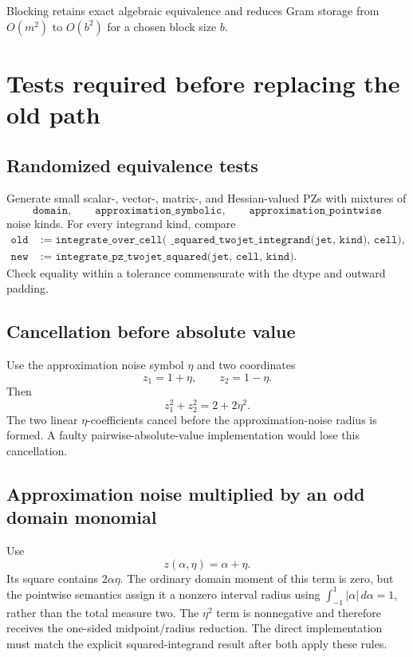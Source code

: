 \documentclass[11pt]{article}
\newcommand{\abs}[1]{\left\lvert #1\right\rvert}
\begin{document}
Blocking retains exact algebraic equivalence and reduces Gram storage from
\(O(m^2)\) to \(O(b^2)\) for a chosen block size \(b\).

\section{Tests required before replacing the old path}
\label{sec:tests}

\subsection{Randomized equivalence tests}

Generate small scalar-, vector-, matrix-, and Hessian-valued PZs with mixtures
of
\[
    \texttt{domain},\qquad
    \texttt{approximation\_symbolic},\qquad
    \texttt{approximation\_pointwise}
\]
noise kinds.  For every integrand kind, compare
\begin{align*}
    \texttt{old}
    &:=
    \texttt{integrate\_over\_cell(
       \_squared\_twojet\_integrand(jet, kind), cell)},\\
    \texttt{new}
    &:=
    \texttt{integrate\_pz\_twojet\_squared(jet, cell, kind)}.
\end{align*}
Check equality within a tolerance commensurate with the dtype and outward
padding.

\subsection{Cancellation before absolute value}

Use the approximation noise symbol \(\eta\) and two coordinates
\[
    z_1=1+\eta,
    \qquad
    z_2=1-\eta.
\]
Then
\[
    z_1^2+z_2^2=2+2\eta^2.
\]
The two linear \(\eta\)-coefficients cancel before the approximation-noise radius is
formed.  A faulty pairwise-absolute-value implementation would lose this
cancellation.

\subsection{Approximation noise multiplied by an odd domain monomial}

Use
\[
    z(\alpha,\eta)=\alpha+\eta.
\]
Its square contains \(2\alpha\eta\).  The ordinary domain moment of this term
is zero, but the pointwise semantics assign it a nonzero interval radius using
\(\int_{-1}^1\abs{\alpha}\,d\alpha=1\), rather than the total measure two.
The \(\eta^2\) term is nonnegative and therefore receives the one-sided
midpoint/radius reduction.  The direct implementation must match the explicit
squared-integrand result after both apply these rules.
\end{document}
